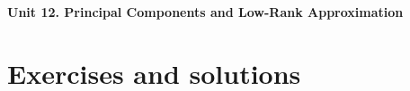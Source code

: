 \documentclass[12pt]{article}
\begin{document}
{\Large\bfseries Unit 12. Principal Components and Low-Rank Approximation}\par

\clearpage
\section*{Exercises and solutions}

\end{document}
